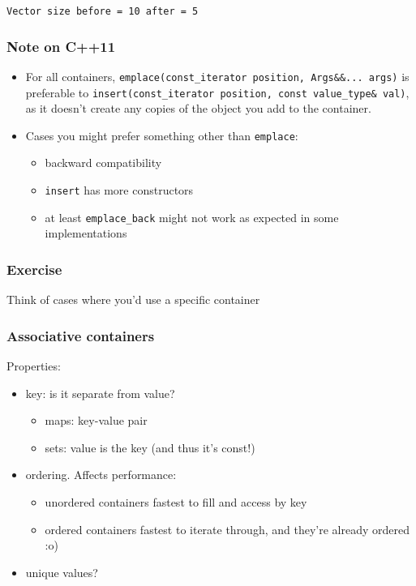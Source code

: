 \texttt{Vector size before = 10 after = 5}

\subsubsection{Note on C++11}\label{note-on-c11}

\begin{itemize}
\itemsep1pt\parskip0pt
\item
  For all containers,
  \texttt{emplace(const\_iterator position, Args\&\&... args)} is
  preferable to
  \texttt{insert(const\_iterator position, const value\_type\& val)}, as
  it doesn't create any copies of the object you add to the container.
\item
  Cases you might prefer something other than \texttt{emplace}:

  \begin{itemize}
  \itemsep1pt\parskip0pt
  \item
    backward compatibility
  \item
    \texttt{insert} has more constructors
  \item
    at least \texttt{emplace\_back} might not work as expected in some
    implementations
  \end{itemize}
\end{itemize}

\subsubsection{Exercise}\label{exercise-1}

Think of cases where you'd use a specific container

\subsubsection{Associative containers}\label{associative-containers}

Properties:

\begin{itemize}
\itemsep1pt\parskip0pt
\item
  key: is it separate from value?

  \begin{itemize}
  \itemsep1pt\parskip0pt
  \item
    maps: key-value pair
  \item
    sets: value is the key (and thus it's const!)
  \end{itemize}
\item
  ordering. Affects performance:

  \begin{itemize}
  \itemsep1pt\parskip0pt
  \item
    unordered containers fastest to fill and access by key
  \item
    ordered containers fastest to iterate through, and they're already
    ordered :o)
  \end{itemize}
\item
  unique values?
\end{itemize}

